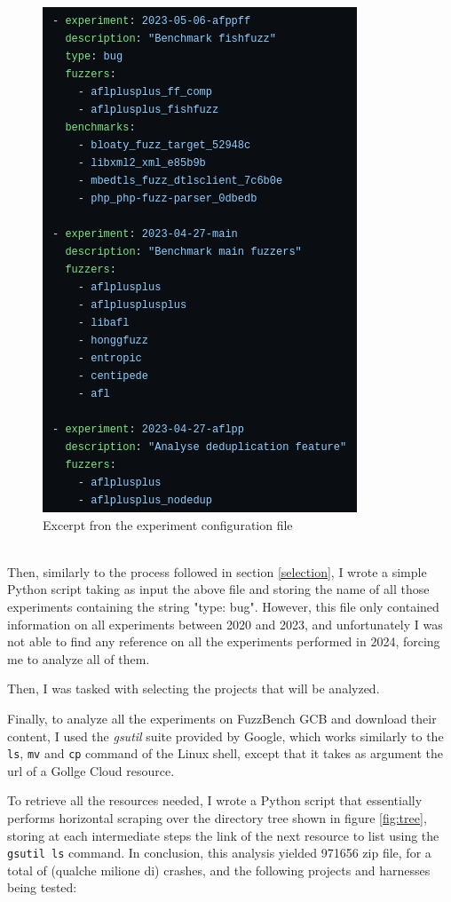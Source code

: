 \begin{figure}[h]
\centering
\includegraphics[scale=0.55]{foto/exp_yaml.png}
\caption{Excerpt fron the experiment configuration file}
\label{fig:exp_yaml}
\end{figure}
\ \\
Then, similarly to the process followed in section \ref{selection}, I wrote a simple Python script taking as input the above file and storing the name of all those experiments containing the string "type: bug".
However, this file only contained information on all experiments between 2020 and 2023, and unfortunately I was not able to find any reference on all the experiments performed in 2024, forcing me to analyze all of them.


Then, I was tasked with selecting the projects that will be analyzed.


Finally, to analyze all the experiments on FuzzBench GCB and download their content, I used the \textit{gsutil} suite provided by Google, which works similarly to the \verb|ls|, \verb|mv| and \verb|cp| command of the Linux shell, except that it takes as argument the url of a Gollge Cloud resource.

To retrieve all the resources needed, I wrote a Python script that essentially performs horizontal scraping over the directory tree shown in figure \ref{fig:tree}, storing at each intermediate steps the link of the next resource to list using the \verb|gsutil ls| command.
In conclusion, this analysis yielded 971656 zip file, for a total of (qualche milione di) crashes, and the following projects and harnesses being tested:

